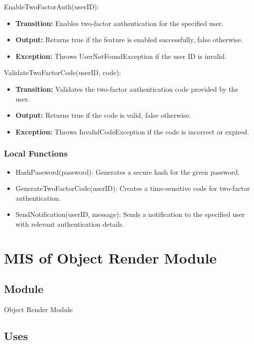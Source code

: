 \documentclass[12pt, titlepage]{article}
\begin{document}
\noindent EnableTwoFactorAuth(userID):
\begin{itemize}
  \item \textbf{Transition:} Enables two-factor authentication for the specified user.
  \item \textbf{Output:} Returns true if the feature is enabled successfully, false otherwise.
  \item \textbf{Exception:} Throws UserNotFoundException if the user ID is invalid.
\end{itemize}

\noindent ValidateTwoFactorCode(userID, code):
\begin{itemize}
  \item \textbf{Transition:} Validates the two-factor authentication code provided by the user.
  \item \textbf{Output:} Returns true if the code is valid, false otherwise.
  \item \textbf{Exception:} Throws InvalidCodeException if the code is incorrect or expired.
\end{itemize}

\subsubsection{Local Functions}

\begin{itemize}
  \item HashPassword(password): Generates a secure hash for the given password.
  \item GenerateTwoFactorCode(userID): Creates a time-sensitive code for two-factor authentication.
  \item SendNotification(userID, message): Sends a notification to the specified user with relevant authentication details.
\end{itemize}

\newpage

\section{MIS of Object Render Module} \label{ObjectRenderModule}

\subsection{Module}

Object Render Module

\subsection{Uses}
\end{document}
